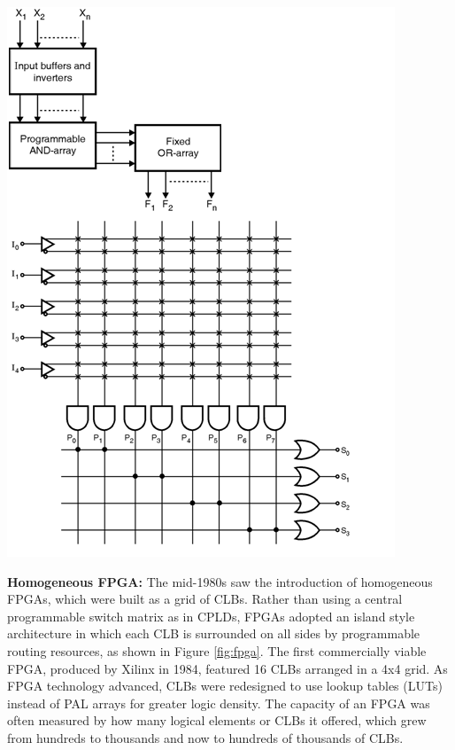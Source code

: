 \documentclass{article}
\begin{document}
\begin{multicols}{2}
    {
        \centering
        \includegraphics[width=\columnwidth]{figures/pal_2.png}
        \label{fig:pal_2}
    }

    \newcolumn

    \textbf{Homogeneous FPGA:} \quad 
    The mid-1980s saw the introduction of homogeneous FPGAs, which were built as a grid of CLBs. 
    Rather than using a central programmable switch matrix as in CPLDs, FPGAs adopted an island style architecture in which each CLB is surrounded on all sides by programmable routing resources, as shown in Figure \ref{fig:fpga}. 
    The first commercially viable FPGA, produced by Xilinx in 1984, featured 16 CLBs arranged in a 4x4 grid. 
    As FPGA technology advanced, CLBs were redesigned to use lookup tables (LUTs) instead of PAL arrays for greater logic density. 
    The capacity of an FPGA was often measured by how many logical elements or CLBs it offered, which grew from hundreds to thousands and now to hundreds of thousands of CLBs.
    \\ 


\end{multicols}
\end{document}
